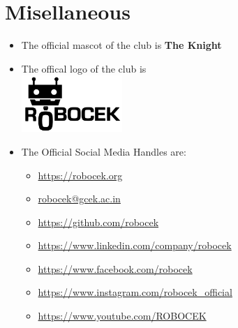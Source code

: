 \chapter{Misellaneous}

\begin{itemize}
	\item The official mascot of the club is \textbf{The Knight}
	\item The offical logo of the club is \\[0.25in]
		\includegraphics[width=0.3\textwidth]{Images/ROBOCEK_logo_black.jpeg}
	\item The Official Social Media Handles are:
	
	\begin{itemize}
		\item \url{https://robocek.org}
		\item \href{mailto: robocek@gcek.ac.in}{robocek@gcek.ac.in}
		\item \url{https://github.com/robocek}
		\item \url{https://www.linkedin.com/company/robocek}
		\item \url{https://www.facebook.com/robocek}
		\item \url{https://www.instagram.com/robocek\_official}
		\item \url{https://www.youtube.com/ROBOCEK}		
	\end{itemize}
\end{itemize}
